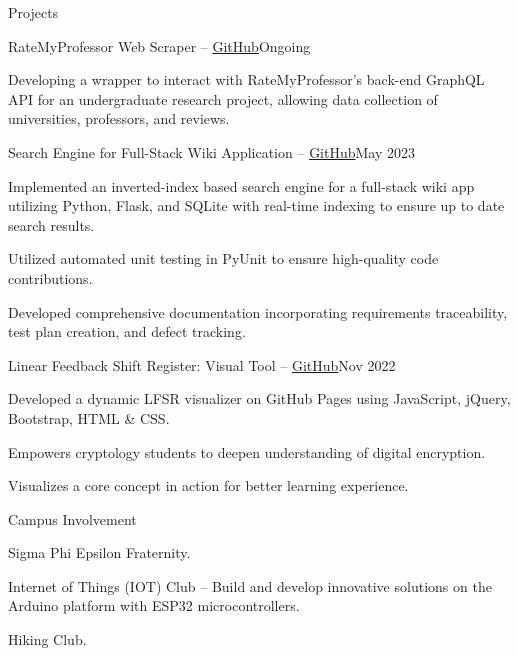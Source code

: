 \documentclass[11pt]{resume}
\begin{document}
\begin{rSection}{Projects}

   \begin{rSubsection}{RateMyProfessor Web Scraper -- \href{https://github.com/Will-Alger/rmp-py}{GitHub}}{Ongoing}{}{}
       \item Developing a wrapper to interact with RateMyProfessor’s back-end GraphQL API for an undergraduate research project, allowing data collection of universities, professors, and reviews.
   \end{rSubsection}
   
   
   \begin{rSubsection}{Search Engine for Full-Stack Wiki Application -- \href{https://github.com/Will-Alger/Riki}{GitHub}}{May 2023}{}{}
       \item Implemented an inverted-index based search engine for a full-stack wiki app utilizing Python, Flask, and SQLite with real-time indexing to ensure up to date search results.
       \item Utilized automated unit testing in PyUnit to ensure high-quality code contributions.
       \item Developed comprehensive documentation incorporating requirements traceability, test plan creation, and defect tracking.
   \end{rSubsection}
	
    \begin{rSubsection}{Linear Feedback Shift Register: Visual Tool -- \href{https://will-alger.github.io/LFSR/}{GitHub}}{Nov 2022}{}{}
            \item Developed a dynamic LFSR visualizer on GitHub Pages using JavaScript, jQuery, Bootstrap, HTML \& CSS.
            \item Empowers cryptology students to deepen understanding of digital encryption.
            \item Visualizes a core concept in action for better learning experience.
    \end{rSubsection}
	
\end{rSection}

\begin{rSection}{Campus Involvement}
    \item Sigma Phi Epsilon Fraternity.
    \item Internet of Things (IOT) Club -- Build and develop innovative solutions on the Arduino platform with ESP32 microcontrollers.
    \item Hiking Club.
\end{rSection}
\end{document}
